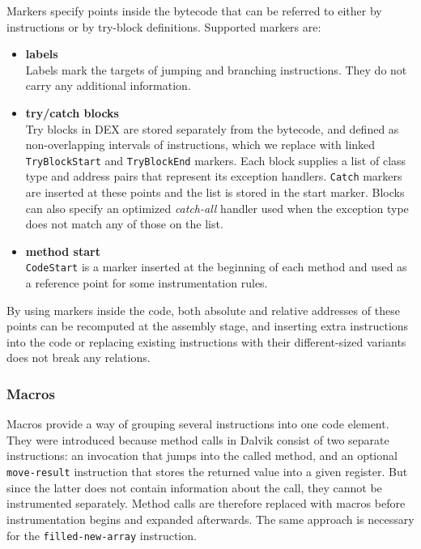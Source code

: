 \documentclass[12pt,twoside,notitlepage]{report}
\begin{document}
Markers specify points inside the bytecode that can be referred to either by instructions or by try-block definitions. Supported markers are:
\begin{itemize}
\item \textbf{labels} \\
Labels mark the targets of jumping and branching instructions. They do not carry any additional information.
\item \textbf{try/catch blocks} \\
Try blocks in DEX are stored separately from the bytecode, and defined as non-overlapping intervals of instructions, which we replace with linked \verb$TryBlockStart$ and \verb$TryBlockEnd$ markers. Each block supplies a list of class type and address pairs that represent its exception handlers. \verb$Catch$ markers are inserted at these points and the list is stored in the start marker. Blocks can also specify an optimized \emph{catch-all} handler used when the exception type does not match any of those on the list.
\item \textbf{method start} \\
\verb$CodeStart$ is a marker inserted at the beginning of each method and used as a reference point for some instrumentation rules.
\end{itemize}

By using markers inside the code, both absolute and relative addresses of these points can be recomputed at the assembly stage, and inserting extra instructions into the code or replacing existing instructions with their different-sized variants does not break any relations.

\subsubsection{Macros}
\label{section:Code_Macros}

Macros provide a way of grouping several instructions into one code element. They were introduced because method calls in Dalvik consist of two separate instructions: an invocation that jumps into the called method, and an optional \verb$move-result$ instruction that stores the returned value into a given register. But since the latter does not contain information about the call, they cannot be instrumented separately. Method calls are therefore replaced with macros before instrumentation begins and expanded afterwards. The same approach is necessary for the \verb$filled-new-array$ instruction.
\end{document}
